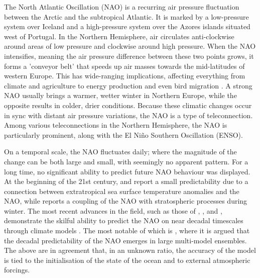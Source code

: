 

    
    The North Atlantic Oscillation (NAO) is a recurring air pressure fluctuation between the Arctic and the subtropical Atlantic. It is marked by a low-pressure system over Iceland and a high-pressure system over the Azores islands situated west of Portugal. In the Northern Hemisphere, air circulates anti-clockwise around areas of low pressure and clockwise around high pressure. When the NAO intensifies, meaning the air pressure difference between these two points grows, it forms a 'conveyor belt' that speeds up air masses towards the mid-latitudes of western Europe. This has wide-ranging implications, affecting everything from climate and agriculture to energy production and even bird migration \citep{Hurrell2003}. A strong NAO usually brings a warmer, wetter winter in Northern Europe, while the opposite results in colder, drier conditions. Because these climatic changes occur in sync with distant air pressure variations, the NAO is a type of teleconnection. Among various teleconnections in the Northern Hemisphere, the NAO is particularly prominent, along with the El Niño Southern Oscillation (ENSO).

    On a temporal scale, the NAO fluctuates daily; where the magnitude of the change can be both large and small, with seemingly no apparent pattern. For a long time, no significant ability to predict future NAO behaviour was displayed. At the beginning of the 21st century, \cite{AtmosphericGCMResponsetoExtratropicalSSTAnomaliesSynthesisandEvaluation} and \cite{hoerling2001} report a small predictability due to a connection between extratropical sea surface temperature anomalies and the NAO, while \cite{Thompsondoi:https://doi.org/10.1029/134GM05} reports a coupling of the NAO with stratospheric processes during winter.
    The most recent advances in the field, such as those of \cite{Athanasiadis2020}, \cite{Dunstone2016}, \cite{Scaifehttps://doi.org/10.1002/2014GL059637} and \cite{Smith2020}, demonstrate the skilful ability to predict the NAO on near decadal timescales through climate models \citep{Klavans2021}. The most notable of which is \cite{Smith2020}, where it is argued that the decadal predictability of the NAO emerges in large multi-model ensembles. The above are in agreement that, in an unknown ratio, the accuracy of the model is tied to the initialisation of the state of the ocean and to external atmospheric forcings.
    
